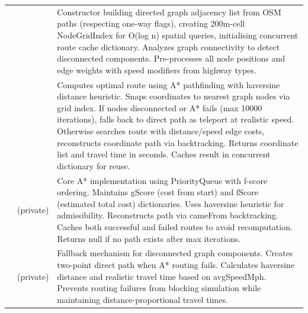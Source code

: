 \begin{longtable}{|L{4cm}|L{4cm}|L{6cm}|}
 & 
 & 
Constructor building directed graph adjacency list from OSM paths (respecting one-way flags), creating 200m-cell NodeGridIndex for O(log n) spatial queries, initialising concurrent route cache dictionary. Analyzes graph connectivity to detect disconnected components. Pre-processes all node positions and edge weights with speed modifiers from highway types. \\
&  & 
Computes optimal route using A* pathfinding with haversine distance heuristic. Snaps coordinates to nearest graph nodes via grid index. If nodes disconnected or A* fails (max 10000 iterations), falls back to direct path as teleport at realistic speed. Otherwise searches route with distance/speed edge costs, reconstructs coordinate path via backtracking. Returns coordinate list and travel time in seconds. Caches result in concurrent dictionary for reuse. \\
&  (private) & 
Core A* implementation using PriorityQueue with f-score ordering. Maintains gScore (cost from start) and fScore (estimated total cost) dictionaries. Uses haversine heuristic for admissibility. Reconstructs path via cameFrom backtracking. Caches both successful and failed routes to avoid recomputation. Returns null if no path exists after max iterations. \\
&  (private) & 
Fallback mechanism for disconnected graph components. Creates two-point direct path when A* routing fails. Calculates haversine distance and realistic travel time based on avgSpeedMph. Prevents routing failures from blocking simulation while maintaining distance-proportional travel times. \\
\hline


\end{longtable}
